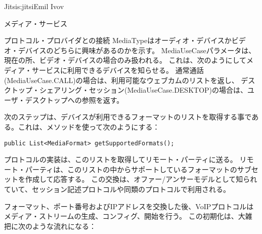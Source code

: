 \begin{aosachapter}{Jitsi}{s:jitsi}{Emil Ivov}
\begin{aosasect1}{メディア・サービス}
\begin{aosasect2}{プロトコル・プロバイダとの接続}
\noindent MediaTypeはオーディオ・デバイスかビデオ・デバイスのどちらに興味があるのかを示す。
MediaUseCaseパラメータは、現在の所、ビデオ・デバイスの場合のみ扱われる。
これは、次のようにしてメディア・サービスに利用できるデバイスを知らせる。
通常通話(MediaUseCase.CALL)の場合は、利用可能なウェブカムのリストを返し、
デスクトップ・シェアリング・セッション(MediaUseCase.DESKTOP)の場合は、ユーザ・デスクトップへの参照を返す。

次のステップは、デバイスが利用できるフォーマットのリストを取得する事である。これは、メソッドを使って次のようにする：

\begin{verbatim}
public List<MediaFormat> getSupportedFormats();
\end{verbatim}

\noindent プロトコルの実装は、このリストを取得してリモート・パーティに送る。
リモート・パーティは、このリストの中からサポートしているフォーマットのサブセットを作成して応答する。
この交換は、オファー/アンサーモデルとして知られていて、セッション記述プロトコルや同類のプロトコルで利用される。

フォーマット、ポート番号およびIPアドレスを交換した後、VoIPプロトコルはメディア・ストリームの生成、コンフィグ、開始を行う。
この初期化は、大雑把に次のような流れになる：



\end{aosasect2}
\end{aosasect1}
\end{aosachapter}
